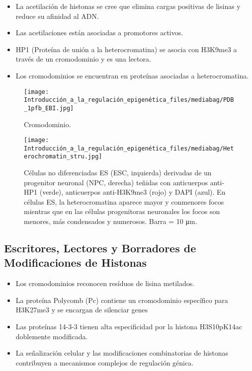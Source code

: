 \documentclass[
  letterpaper,
  DIV=11,
  numbers=noendperiod]{scrartcl}
\providecommand{\tightlist}{%
  \setlength{\itemsep}{0pt}\setlength{\parskip}{0pt}}\usepackage{longtable,booktabs,array}
\begin{document}
\begin{itemize}
\tightlist
\item
  La acetilación de histonas se cree que elimina cargas positivas de
  lisinas y reduce su afinidad al ADN.
\item
  Las acetilaciones están asociadas a promotores activos.
\item
  HP1 (Proteína de unión a la heterocromatina) se asocia con H3K9me3 a
  través de un cromodominio y es una lectora.
\item
  Los cromodominios se encuentran en proteínas asociadas a
  heterocromatina.
\end{itemize}

\begin{figure}[H]

{\centering \texttt{[image: Introducción\_a\_la\_regulación\_epigenética\_files/mediabag/PDB\_1pfb\_EBI.jpg]}

}

\caption{Cromodominio.}

\end{figure}%

\begin{figure}[H]

{\centering \texttt{[image: Introducción\_a\_la\_regulación\_epigenética\_files/mediabag/Heterochromatin\_stru.jpg]}

}

\caption{Células no diferenciadas ES (ESC, izquierda) derivadas de un
progenitor neuronal (NPC, derecha) teñidas con anticuerpos anti-HP1
(verde), anticuerpos anti-H3K9me3 (rojo) y DAPI (azul). En células ES,
la heterocromatina aparece mayor y conmenores focos mientras que en las
células progenitoras neuronales los focos son menores, más condensados y
numerosos. Barra = 10 μm.}

\end{figure}%

\subsection{Escritores, Lectores y Borradores de Modificaciones de
Histonas}\label{escritores-lectores-y-borradores-de-modificaciones-de-histonas-1}

\begin{itemize}
\tightlist
\item
  Los cromodominios reconocen resíduos de lisina metilados.
\item
  La proteína Polycomb (Pc) contiene un cromodominio específico para
  H3K27me3 y se encargan de silenciar genes
\item
  Las proteínas 14-3-3 tienen alta especificidad por la histona
  H3S10pK14ac doblemente modificada.
\item
  La señalización celular y las modificaciones combinatorias de histonas
  contribuyen a mecanismos complejos de regulación génica.
\end{itemize}
\end{document}
